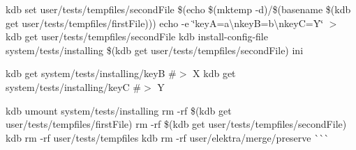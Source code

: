 kdb set user/tests/tempfiles/second\+File \$(echo \$(mktemp -\/d)/\$(basename \$(kdb get user/tests/tempfiles/first\+File))) echo -\/e \char`\"{}key\+A=a\textbackslash{}nkey\+B=b\textbackslash{}nkey\+C=\+Y\char`\"{} $>$ {\ttfamily kdb get user/tests/tempfiles/second\+File} kdb install-\/config-\/file system/tests/installing \$(kdb get user/tests/tempfiles/second\+File) ini 
\begin{DoxyCode}{0}
\end{DoxyCode}


kdb get system/tests/installing/keyB \#$>$ X kdb get system/tests/installing/keyC \#$>$ Y 
\begin{DoxyCode}{0}
\end{DoxyCode}


kdb umount system/tests/installing rm -\/rf \$(kdb get user/tests/tempfiles/first\+File) rm -\/rf \$(kdb get user/tests/tempfiles/second\+File) kdb rm -\/rf user/tests/tempfiles kdb rm -\/rf user/elektra/merge/preserve \`{}\`{}\`{} 